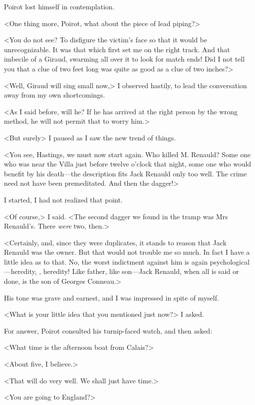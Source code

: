  Poirot lost himself in contemplation. 

 <One thing more, Poirot, what about the piece of lead piping?> 

 <You do not see? To disfigure the victim's face so that it would be unrecognizable. It was that which first set me on the right track. And that imbecile of a Giraud, swarming all over it to look for match ends! Did I not tell you that a clue of two feet long was quite as good as a clue of two inches?> 

 <Well, Giraud will sing small now,> I observed hastily, to lead the conversation away from my own shortcomings. 

 <As I said before, will he? If he has arrived at the right person by the wrong method, he will not permit that to worry him.> 

 <But surely\longdash> I paused as I saw the new trend of things. 

 <You see, Hastings, we must now start again. Who killed M. Renauld? Some one who was near the Villa just before twelve o'clock that night, some one who would benefit by his death—the description fits Jack Renauld only too well. The crime need not have been premeditated. And then the dagger!> 

 I started, I had not realized that point. 

 <Of course,> I said. <The second dagger we found in the tramp was Mrs Renauld's. There \emph{were} two, then.> 

 <Certainly, and, since they were duplicates, it stands to reason that Jack Renauld was the owner. But that would not trouble me so much. In fact I have a little idea as to that. No, the worst indictment against him is again psychological—heredity, , heredity! Like father, like son—Jack Renauld, when all is said or done, is the son of Georges Conneau.> 

 His tone was grave and earnest, and I was impressed in spite of myself. 

 <What is your little idea that you mentioned just now?> I asked. 

 For answer, Poirot consulted his turnip-faced watch, and then asked: 

 <What time is the afternoon boat from Calais?> 

 <About five, I believe.> 

 <That will do very well. We shall just have time.> 

 <You are going to England?> 

